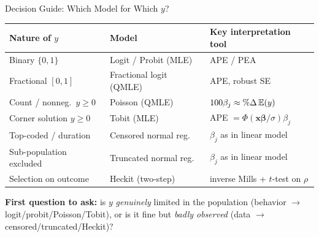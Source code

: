 \documentclass[aspectratio=169, 12pt]{beamer}
\newcommand{\xbeta}{\mathbf{x}\boldsymbol{\beta}}   %
\begin{document}
\begin{frame}{Decision Guide: Which Model for Which $y$?}

  \begin{center}
  \small
  \begin{tabular}{l l l}
    \toprule
    Nature of $y$ & Model & Key interpretation tool \\
    \midrule
    Binary $\{0,1\}$        & Logit / Probit (MLE)      & APE / PEA \\
    Fractional $[0,1]$      & Fractional logit (QMLE)   & APE, robust SE \\
    Count / nonneg.\ $y\ge0$& Poisson (QMLE)            & $100\beta_j\approx \%\Delta\operatorname{\mathbb{E}}(y)$ \\
    Corner solution $y\ge0$ & Tobit (MLE)               & APE $=\Phi(\xbeta/\sigma)\beta_j$ \\
    Top-coded / duration    & Censored normal reg.      & $\beta_j$ as in linear model \\
    Sub-population excluded & Truncated normal reg.     & $\beta_j$ as in linear model \\
    Selection on outcome    & Heckit (two-step)         & inverse Mills + $t$-test on $\rho$ \\
    \bottomrule
  \end{tabular}
  \end{center}

  \smallskip

  \begin{keybox}
    \textbf{First question to ask:} is $y$ \emph{genuinely} limited in the
    population (behavior $\to$ logit/probit/Poisson/Tobit), or is it fine but
    \emph{badly observed} (data $\to$ censored/truncated/Heckit)?
  \end{keybox}

\end{frame}
\end{document}
